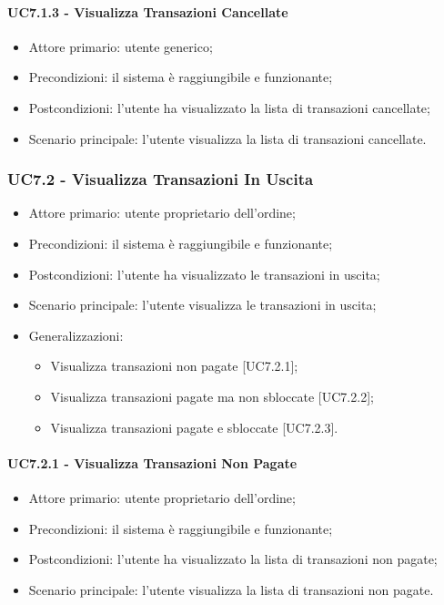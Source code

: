 \paragraph{UC7.1.3 - Visualizza Transazioni Cancellate}

\begin{itemize}
    \item Attore primario: utente generico;
    \item Precondizioni: il sistema è raggiungibile e funzionante;
    \item Postcondizioni: l'utente ha visualizzato la lista di transazioni cancellate;
    \item Scenario principale: l'utente visualizza la lista di transazioni cancellate.
\end{itemize}

\subsubsection{UC7.2 - Visualizza Transazioni In Uscita}

\begin{itemize}
    \item Attore primario: utente proprietario dell'ordine;
    \item Precondizioni: il sistema è raggiungibile e funzionante;
    \item Postcondizioni: l'utente ha visualizzato le transazioni in uscita;
    \item Scenario principale: l'utente visualizza le transazioni in uscita;
    \item Generalizzazioni:
          \begin{itemize}
              \item Visualizza transazioni non pagate [UC7.2.1];
              \item Visualizza transazioni pagate ma non sbloccate [UC7.2.2];
              \item Visualizza transazioni pagate e sbloccate [UC7.2.3].
          \end{itemize}
\end{itemize}

\paragraph{UC7.2.1 - Visualizza Transazioni Non Pagate}

\begin{itemize}
    \item Attore primario: utente proprietario dell'ordine;
    \item Precondizioni: il sistema è raggiungibile e funzionante;
    \item Postcondizioni: l'utente ha visualizzato la lista di transazioni non pagate;
    \item Scenario principale: l'utente visualizza la lista di transazioni non pagate.
\end{itemize}

